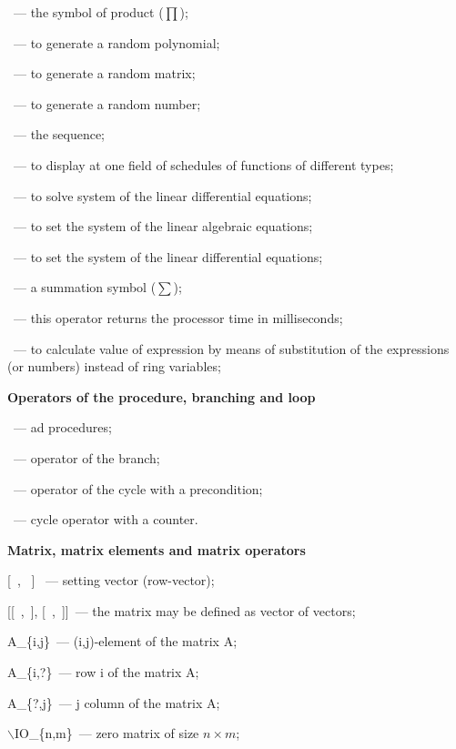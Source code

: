  ~--- the symbol of product ($\prod$); 

 ~--- to generate a random polynomial; 

 ~--- to generate a random matrix; 

 ~--- to generate a random number; 

 ~--- the sequence; 

 ~--- to display at one field of schedules of functions of different types;
 
 ~--- to solve system of the linear differential equations; 

 ~--- to set the system of the linear algebraic equations; 

 ~--- to set the system of the linear differential equations; 

 ~---  a summation symbol ($\sum$); 

 ~--- this operator returns the processor time in milliseconds;  

 ~--- to calculate value of expression by means of substitution of the expressions (or numbers) instead of ring variables; 
 
\bigskip
 
 {\bf Operators of the procedure, branching and loop}

 ~--- ad procedures;
 
 ~--- operator of the branch;

~--- operator of the cycle with a precondition;

~--- cycle operator with a counter. 

\bigskip

{\bf Matrix, matrix elements and  matrix operators}

[\ , \  ] ~--- setting vector (row-vector);

[[\ ,\  ], [\ ,\  ]]~--- the matrix may be defined as vector of vectors;  


A\_\{i,j\}~--- (i,j)-element of the matrix A;

A\_\{i,?\}~---  row i of the matrix A;

A\_\{?,j\}~---  j column of the matrix A;

$\backslash$IO\_\{n,m\}~--- zero matrix of size $ n \times m $;

